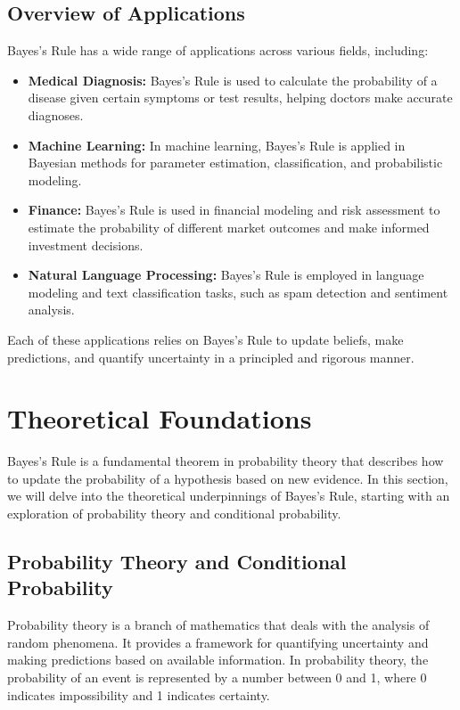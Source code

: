 \documentclass[12pt]{book} %
\begin{document}
\subsection{Overview of Applications}

Bayes's Rule has a wide range of applications across various fields, including:
\begin{itemize}
    \item \textbf{Medical Diagnosis:} Bayes's Rule is used to calculate the probability of a disease given certain symptoms or test results, helping doctors make accurate diagnoses.
    \item \textbf{Machine Learning:} In machine learning, Bayes's Rule is applied in Bayesian methods for parameter estimation, classification, and probabilistic modeling.
    \item \textbf{Finance:} Bayes's Rule is used in financial modeling and risk assessment to estimate the probability of different market outcomes and make informed investment decisions.
    \item \textbf{Natural Language Processing:} Bayes's Rule is employed in language modeling and text classification tasks, such as spam detection and sentiment analysis.
\end{itemize}
Each of these applications relies on Bayes's Rule to update beliefs, make predictions, and quantify uncertainty in a principled and rigorous manner.

\section{Theoretical Foundations}
Bayes's Rule is a fundamental theorem in probability theory that describes how to update the probability of a hypothesis based on new evidence. In this section, we will delve into the theoretical underpinnings of Bayes's Rule, starting with an exploration of probability theory and conditional probability.

\subsection{Probability Theory and Conditional Probability}
Probability theory is a branch of mathematics that deals with the analysis of random phenomena. It provides a framework for quantifying uncertainty and making predictions based on available information. In probability theory, the probability of an event is represented by a number between 0 and 1, where 0 indicates impossibility and 1 indicates certainty.
\end{document}
